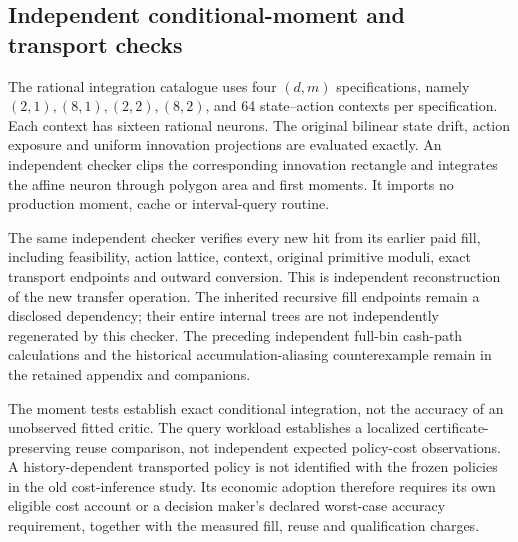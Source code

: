 \subsection{Independent conditional-moment and transport checks}
The rational integration catalogue uses four $(d,m)$ specifications, namely $(2,1),(8,1),(2,2),(8,2)$, and 64 state--action contexts per specification. Each context has sixteen rational neurons. The original bilinear state drift, action exposure and uniform innovation projections are evaluated exactly. An independent checker clips the corresponding innovation rectangle and integrates the affine neuron through polygon area and first moments. It imports no production moment, cache or interval-query routine.



The same independent checker verifies every new hit from its earlier paid fill, including feasibility, action lattice, context, original primitive moduli, exact transport endpoints and outward conversion. This is independent reconstruction of the new transfer operation. The inherited recursive fill endpoints remain a disclosed dependency; their entire internal trees are not independently regenerated by this checker. The preceding independent full-bin cash-path calculations and the historical accumulation-aliasing counterexample remain in the retained appendix and companions.

The moment tests establish exact conditional integration, not the accuracy of an unobserved fitted critic. The query workload establishes a localized certificate-preserving reuse comparison, not independent expected policy-cost observations. A history-dependent transported policy is not identified with the frozen policies in the old cost-inference study. Its economic adoption therefore requires its own eligible cost account or a decision maker's declared worst-case accuracy requirement, together with the measured fill, reuse and qualification charges.
